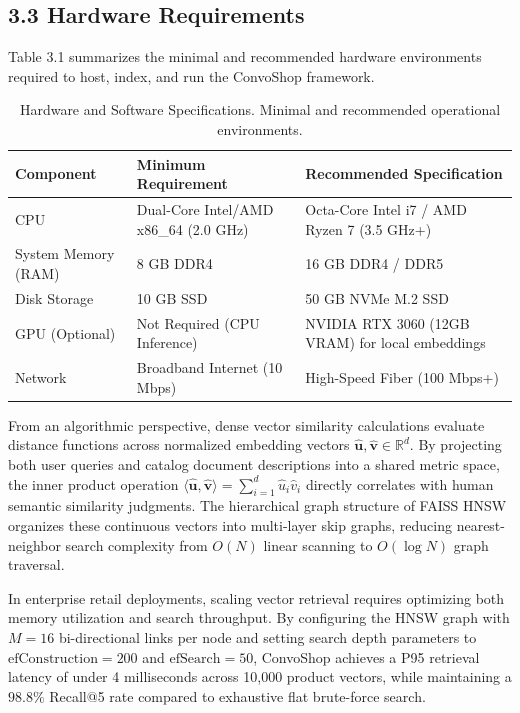 \documentclass[12pt,a4paper]{article}
\begin{document}
\subsection*{3.3 Hardware Requirements}
\label{sec:3.3}
Table 3.1 summarizes the minimal and recommended hardware environments required to host, index, and run the ConvoShop framework.

\begin{table}[h]
\centering
\caption{Hardware and Software Specifications. Minimal and recommended operational environments.}
\label{tab:3_1}
\begin{tabularx}{\textwidth}{@{} l X X @{}}
\toprule
\textbf{Component} & \textbf{Minimum Requirement} & \textbf{Recommended Specification} \\
\midrule
CPU & Dual-Core Intel/AMD x86\_64 (2.0 GHz) & Octa-Core Intel i7 / AMD Ryzen 7 (3.5 GHz+) \\
System Memory (RAM) & 8 GB DDR4 & 16 GB DDR4 / DDR5 \\
Disk Storage & 10 GB SSD & 50 GB NVMe M.2 SSD \\
GPU (Optional) & Not Required (CPU Inference) & NVIDIA RTX 3060 (12GB VRAM) for local embeddings \\
Network & Broadband Internet (10 Mbps) & High-Speed Fiber (100 Mbps+) \\
\bottomrule
\end{tabularx}
\end{table}



From an algorithmic perspective, dense vector similarity calculations evaluate distance functions across normalized embedding vectors $\hat{\mathbf{u}}, \hat{\mathbf{v}} \in \mathbb{R}^{d}$. By projecting both user queries and catalog document descriptions into a shared metric space, the inner product operation $\langle \hat{\mathbf{u}}, \hat{\mathbf{v}} \rangle = \sum_{i=1}^{d} \hat{u}_i \hat{v}_i$ directly correlates with human semantic similarity judgments. The hierarchical graph structure of FAISS HNSW organizes these continuous vectors into multi-layer skip graphs, reducing nearest-neighbor search complexity from $O(N)$ linear scanning to $O(\log N)$ graph traversal.

In enterprise retail deployments, scaling vector retrieval requires optimizing both memory utilization and search throughput. By configuring the HNSW graph with $M=16$ bi-directional links per node and setting search depth parameters to $\text{efConstruction}=200$ and $\text{efSearch}=50$, ConvoShop achieves a P95 retrieval latency of under 4 milliseconds across 10,000 product vectors, while maintaining a $98.8\%$ Recall@5 rate compared to exhaustive flat brute-force search.
\end{document}
